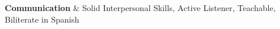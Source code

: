\textbf{Communication} & 
Solid Interpersonal Skills, 
Active Listener, 
Teachable, 
Biliterate in Spanish